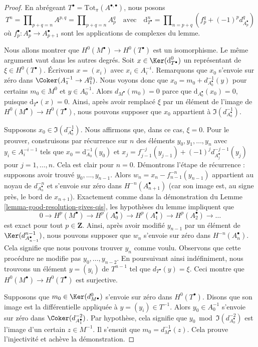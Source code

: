 \begin{proof}
En abrégeant $T^\bullet = \text{Tot}_\pi(A^{\bullet, \bullet})$,
nous posons
$$
T^n = \prod\nolimits_{p + q = n} A^{p, q} =
\prod\nolimits_{p + q = n} A_p^q
\quad\text{avec}\quad
\text{d}_{T^\bullet}^n =
\prod\nolimits_{n = p + q} (f_p^q + (-1)^pd_{A_p^\bullet}^q)
$$
où $f_p^\bullet : A_p^\bullet \to A_{p + 1}^\bullet$
sont les applications de complexes du lemme.

\medskip\noindent
Nous allons montrer que $H^0(M^\bullet) \to H^0(T^\bullet)$ est un
isomorphisme. Le même argument vaut dans les autres degrés.
Soit $x \in \Ker(\text{d}_{T^\bullet}^0)$ un représentant de
$\xi \in H^0(T^\bullet)$.
Écrivons $x = (x_i)$ avec $x_i \in A_i^{-i}$.
Remarquons que $x_0$ s'envoie sur zéro dans
$\Coker(A_1^{-1} \to A_1^0)$.
Nous voyons donc que $x_0 = m_0 + d_{A_0^\bullet}^{-1}(y)$ pour certains
$m_0 \in M^0$ et $y \in A_0^{-1}$.
Alors $d_{M^\bullet}(m_0) = 0$ parce que
$\text{d}_{A_0^\bullet}(x_0) = 0$, puisque
$\text{d}_{T^\bullet}(x) = 0$.
Ainsi, après avoir remplacé $\xi$ par un élément de l'image de
$H^0(M^\bullet) \to H^0(T^\bullet)$, nous pouvons supposer que $x_0$
appartient à $\Im(d^{-1}_{A_0^\bullet})$.

\medskip\noindent
Supposons $x_0 \in \Im(d^{-1}_{A_0^\bullet})$. Nous affirmons que, dans ce
cas, $\xi = 0$. Pour le prouver, construisons par récurrence sur $n$ des
éléments $y_0, y_1, \ldots, y_n$ avec $y_i \in A_i^{-i - 1}$ tels que
$x_0 = \text{d}_{A_0}^{-1}(y_0)$ et
$x_j = f_{j - 1}^{-j}(y_{j - 1}) + (-1)^j d^{-j - 1}_{A_j^\bullet}(y_j)$
pour $j = 1, \ldots, n$. Cela est clair pour $n = 0$. Démontrons l'étape
de récurrence : supposons avoir trouvé $y_0, \ldots, y_{n - 1}$. Alors
$w_n = x_n - f_{n - 1}^{-n}(y_{n - 1})$ appartient au noyau de
$d^{-n}_{A_n^\bullet}$ et s'envoie sur zéro dans $H^{-n}(A_{n + 1}^\bullet)$
(car son image est, au signe près, le bord de $x_{n + 1}$). Exactement
comme dans la démonstration du
Lemme \ref{lemma-good-resolution-gives-qis},
les hypothèses du lemme impliquent que
$$
0 \to
H^p(M^\bullet) \to
H^p(A_0^\bullet) \to
H^p(A_1^\bullet) \to
H^p(A_2^\bullet) \to \ldots
$$
est exact pour tout $p \in \mathbf{Z}$. Ainsi, après avoir modifié
$y_{n - 1}$ par un élément de $\Ker(d^{n - 1}_{A_{n - 1}^\bullet})$,
nous pouvons supposer que $w_n$ s'envoie sur zéro dans
$H^{-n}(A_n^\bullet)$. Cela signifie que nous pouvons trouver $y_n$ comme
voulu. Observons que cette procédure ne modifie pas
$y_0, \ldots, y_{n - 2}$. En poursuivant ainsi indéfiniment, nous trouvons
un élément $y = (y_i)$ de $T^{n - 1}$ tel que $d_{T^\bullet}(y) = \xi$.
Ceci montre que $H^0(M^\bullet) \to H^0(T^\bullet)$ est surjective.

\medskip\noindent
Supposons que $m_0 \in \Ker(d^0_{M^\bullet})$ s'envoie sur zéro dans
$H^0(T^\bullet)$. Disons que son image est la différentielle appliquée
à $y = (y_i) \in T^{-1}$.
Alors $y_0 \in A_0^{-1}$ s'envoie sur zéro dans
$\Coker(d^{-2}_{A_1^\bullet})$.
Par hypothèse, cela signifie que
$y_0 \bmod \Im(d^{-2}_{A_0^\bullet})$
est l'image d'un certain $z \in M^{-1}$. Il s'ensuit que
$m_0 = d^{-1}_{M^\bullet}(z)$. Cela prouve l'injectivité et achève la
démonstration.
\end{proof}

